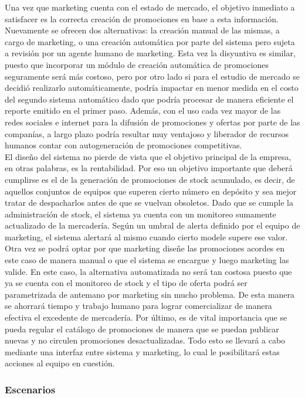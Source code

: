 \indent Una vez que marketing cuenta con el estado de mercado, el objetivo inmediato a satisfacer es la correcta creación de promociones en base a esta información. Nuevamente se ofrecen dos alternativas: la creación manual de las mismas, a cargo de marketing, o una creación automática por parte del sistema pero sujeta a revisión por un agente humano de marketing. Esta vez la disyuntiva es similar, puesto que incorporar un módulo de creación automática de promociones seguramente será más costoso, pero por otro lado si para el estudio de mercado se decidió realizarlo automáticamente, podría impactar en menor medida en el costo del segundo sistema automático dado que podría procesar de manera eficiente el reporte emitido en el primer paso. Además, con el uso cada vez mayor de las redes sociales e internet para la difusión de promociones y ofertas por parte de las companías, a largo plazo podría resultar muy ventajoso y liberador de recursos humanos contar con autogeneración de promociones competitivas.\\
\indent El diseño del sistema no pierde de vista que el objetivo principal de la empresa, en otras palabras, es la rentabilidad. Por eso un objetivo importante que deberá cumplirse es el de la generación de promociones de stock acumulado, es decir, de aquellos conjuntos de equipos que superen cierto número en depósito y sea mejor tratar de despacharlos antes de que se vuelvan obsoletos. Dado que se cumple la administración de stock, el sistema ya cuenta con un monitoreo sumamente actualizado de la mercadería. Según un umbral de alerta definido por el equipo de marketing, el sistema alertará al mismo cuando cierto modele supere ese valor. Otra vez se podrá optar por que marketing diseñe las promociones acordes en este caso de manera manual o que el sistema se encargue y luego marketing las valide. En este caso, la alternativa automatizada no será tan costosa puesto que ya se cuenta con el monitoreo de stock y el tipo de oferta podrá ser parametrizada de antemano por marketing sin mucho problema. De esta manera se ahorrará tiempo y trabajo humano para lograr comercializar de manera efectiva el excedente de mercadería. Por último, es de vital importancia que se pueda regular el catálogo de promociones de manera que se puedan publicar nuevas y no circulen promociones desactualizadas. Todo esto se llevará a cabo mediante una interfaz entre sistema y marketing, lo cual le posibilitará estas acciones al equipo en cuestión.

\subsubsection{Escenarios}

